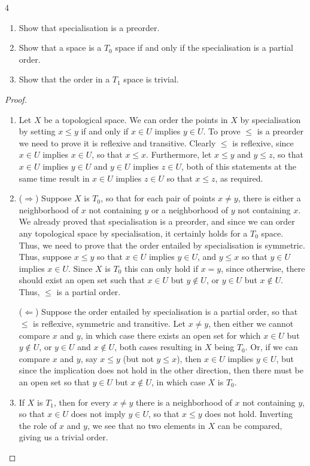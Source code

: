 \begin{exercise}{4}
\begin{enumerate}
    \item Show that specialisation is a preorder.
    \item Show that a space is a $T_0$ space if and only if the specialisation is a partial order.
    \item Show that the order in a $T_1$ space is trivial.
\end{enumerate}
\end{exercise}
\begin{proof}
\begin{enumerate}
    \item Let $X$ be a topological space. 
    We can order the points in $X$ by specialisation by setting $x \leq y$ if and only if $x \in U$ implies $y \in U$.
    To prove $\leq$ is a preorder we need to prove it is reflexive and transitive.
    Clearly $\leq$ is reflexive, since $x \in U$ implies $x \in U$, so that $x \leq x$.
    Furthermore, let $x \leq y$ and $y \leq z$, so that $x \in U$ implies $y \in U$ and $y \in U$ implies $z \in U$, both of this statements at the same time result in $x \in U$ implies $z \in U$ so that $x \leq z$, as required.
    \item ($\Rightarrow$)
    Suppose $X$ is $T_0$, so that for each pair of points $x \neq y$, there is either a neighborhood of $x$ not containing $y$ or a neighborhood of $y$ not containing $x$.
    We already proved that specialisation is a preorder, and since we can order any topological space by specialisation, it certainly holds for a $T_0$ space.
    Thus, we need to prove that the order entailed by specialisation is symmetric.
    Thus, suppose $x \leq y$ so that $x \in U$ implies $y \in U$, and $y \leq x$ so that $y \in U$ implies $x \in U$.
    Since $X$ is $T_0$ this can only hold if $x = y$, since otherwise, there should exist an open set such that $x \in U$ but $y \notin U$, or $y \in U$ but $x \notin U$.
    Thus, $\leq$ is a partial order.

    ($\Leftarrow$)
    Suppose the order entailed by specialisation is a partial order, so that $\leq$ is reflexive, symmetric and transitive.
    Let $x \neq y$, then either we cannot compare $x$ and $y$, in which case there exists an open set for which $x \in U$ but $y \notin U$, or $y \in U$ and $x \notin U$, both cases resulting in $X$ being $T_0$.
    Or, if we can compare $x$ and $y$, say $x \leq y$ (but not $y \leq x$), then $x \in U$ implies $y \in U$, but since the implication does not hold in the other direction, then there must be an open set so that $y \in U$ but $x \notin U$, in which case $X$ is $T_0$.
    \item If $X$ is $T_1$, then for every $x \neq y$ there is a neighborhood of $x$ not containing $y$, so that $x \in U$ does not imply $y \in U$, so that $x \leq y$ does not hold.
    Inverting the role of $x$ and $y$, we see that no two elements in $X$ can be compared, giving us a trivial order.
\end{enumerate}
\end{proof} 


